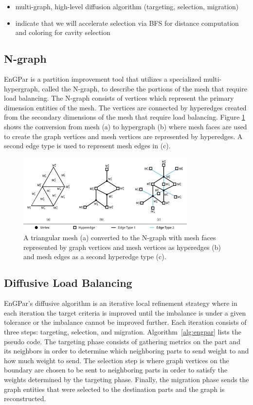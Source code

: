 \documentclass[graybox]{svmult}
\begin{document}
\begin{itemize}
  \item multi-graph, high-level diffusion algorithm (targeting, selection, migration)
  \item indicate that we will accelerate selection via BFS for distance computation and coloring for cavity selection
\end{itemize}

\subsection{N-graph}

EnGPar is a partition improvement tool that utilizes a specialized multi-hypergraph,
called the N-graph, to describe the portions of the mesh that require load balancing.
The N-graph consists of vertices which represent the primary dimension entities of the
mesh. The vertices are connected by hyperedges created from the secondary dimensions of
the mesh that require load balancing. Figure \ref{fig:ngraph} shows the conversion from
mesh (a) to hypergraph (b) where mesh faces are used to create the graph vertices and
mesh vertices are represented by hyperedges. A second edge type is used to represent mesh edges in (c). 

\begin{figure}[!ht]
  \centering
  \includegraphics[width=3.5in]{images/exampleMesh2Graph.png}
  \caption{A triangular mesh (a) converted to the N-graph with mesh faces represented by graph vertices and mesh vertices as hyperedges (b) and mesh edges as a second hyperedge type (c).}
  \label{fig:ngraph}
\end{figure}


\subsection{Diffusive Load Balancing}

EnGPar's diffusive algorithm is an iterative local refinement strategy where in each
iteration the target criteria is improved until the imbalance is under a given
tolerance or the imbalance cannot be improved further. Each iteration consists of three
steps: targeting, selection, and migration.
Algorithm~\ref{alg:engpar} lists the pseudo code.
The targeting phase consists of gathering
metrics on the part and its neighbors in order to determine which neighboring parts to
send weight to and how much weight to send. The selection step is where graph vertices
on the boundary are chosen to be sent to neighboring parts in order to satisfy the
weights determined by the targeting phase. Finally, the migration phase sends the graph
entities that were selected to the destination parts and the graph is reconstructed.
\end{document}
